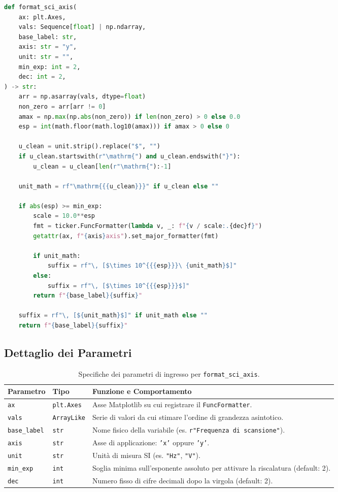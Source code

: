 \documentclass[11pt,a4paper]{article}
\begin{document}
\begin{lstlisting}[language=Python, caption={Implementazione della funzione \texttt{format\_sci\_axis}.}]
def format_sci_axis(
    ax: plt.Axes,
    vals: Sequence[float] | np.ndarray,
    base_label: str,
    axis: str = "y",
    unit: str = "",
    min_exp: int = 2,
    dec: int = 2,
) -> str:
    arr = np.asarray(vals, dtype=float)
    non_zero = arr[arr != 0]
    amax = np.max(np.abs(non_zero)) if len(non_zero) > 0 else 0.0
    esp = int(math.floor(math.log10(amax))) if amax > 0 else 0

    u_clean = unit.strip().replace("$", "")
    if u_clean.startswith(r"\mathrm{") and u_clean.endswith("}"):
        u_clean = u_clean[len(r"\mathrm{"):-1]

    unit_math = rf"\mathrm{{{u_clean}}}" if u_clean else ""

    if abs(esp) >= min_exp:
        scale = 10.0**esp
        fmt = ticker.FuncFormatter(lambda v, _: f"{v / scale:.{dec}f}")
        getattr(ax, f"{axis}axis").set_major_formatter(fmt)

        if unit_math:
            suffix = rf"\, [$\times 10^{{{esp}}}\ {unit_math}$]"
        else:
            suffix = rf"\, [$\times 10^{{{esp}}}$]"
        return f"{base_label}{suffix}"

    suffix = rf"\, [${unit_math}$]" if unit_math else ""
    return f"{base_label}{suffix}"
\end{lstlisting}

\subsection{Dettaglio dei Parametri}

\begin{table}[htbp]
\centering
\small
\begin{tabularx}{\textwidth}{l p{2.5cm} X}
\toprule
\textbf{Parametro} & \textbf{Tipo} & \textbf{Funzione e Comportamento} \\
\midrule
\texttt{ax} & \texttt{plt.Axes} & Asse Matplotlib su cui registrare il \texttt{FuncFormatter}. \\
\texttt{vals} & \texttt{ArrayLike} & Serie di valori da cui stimare l'ordine di grandezza asintotico. \\
\texttt{base\_label} & \texttt{str} & Nome fisico della variabile (es. \texttt{r"Frequenza di scansione"}). \\
\texttt{axis} & \texttt{str} & Asse di applicazione: \texttt{'x'} oppure \texttt{'y'}. \\
\texttt{unit} & \texttt{str} & Unità di misura SI (es. \texttt{"Hz"}, \texttt{"V"}). \\
\texttt{min\_exp} & \texttt{int} & Soglia minima sull'esponente assoluto per attivare la riscalatura (default: 2). \\
\texttt{dec} & \texttt{int} & Numero fisso di cifre decimali dopo la virgola (default: 2). \\
\bottomrule
\end{tabularx}
\caption{Specifiche dei parametri di ingresso per \texttt{format\_sci\_axis}.}
\end{table}
\end{document}
